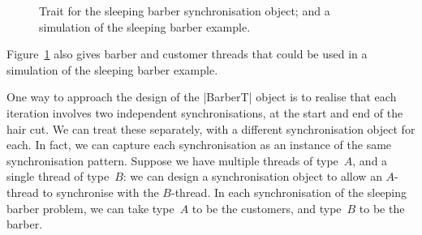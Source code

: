 \begin{figure}
\caption{Trait for the sleeping barber synchronisation object; and a
  simulation of the sleeping barber example.}
\label{fig:BarberT}
\label{fig:sleeping-barber-threads}
\end{figure}


Figure~\ref{fig:sleeping-barber-threads} also gives barber and customer
threads that could be used in a simulation of the sleeping barber example.

One way to approach the design of the |BarberT| object is to realise that each
iteration involves two independent synchronisations, at the start and end of
the hair cut.  We can treat these separately, with a different synchronisation
object for each.  In fact, we can capture each synchronisation as an instance
of the same synchronisation pattern.  Suppose we have multiple threads of
type~$A$, and a single thread of type~$B$: we can design a synchronisation
object to allow an $A$-thread to synchronise with the $B$-thread.  In each
synchronisation of the sleeping barber problem, we can take type~$A$ to be the
customers, and type~$B$ to be the barber.



